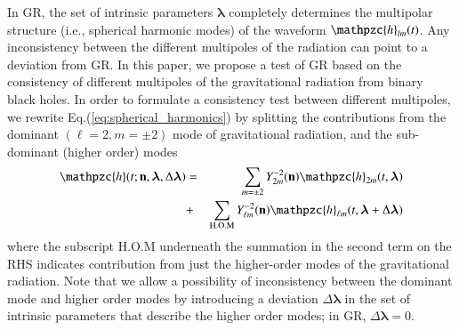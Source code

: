 \documentclass[prl,preprintnumbers,twocolumn,eqsecnum,floatfix,a4paper,nofootinbib,superscriptaddress]{revtex4}
\newcommand{\h}{\mathpzc{h}}
\newcommand{\hlm}{\mathpzc{h}_{\ell m}}
\newcommand{\Ylm}{{Y}^{-2}_{\ell m}}
\newcommand{\blambda}{\bm{\lambda}}
\newcommand{\n}{\mathbf{n}}
\begin{document}
In GR, the set of intrinsic parameters $\blambda$ completely determines the multipolar structure (i.e., spherical harmonic modes) of the waveform ${\h}_{lm}(t)$. Any inconsistency between the different multipoles of the radiation can point to a deviation from GR. In this paper, we propose a test of GR based on the consistency of different multipoles of the gravitational radiation from binary black holes. In order to formulate a consistency test between different multipoles, we rewrite Eq.(\ref{eq:spherical_harmonics}) by splitting the contributions from the dominant $(\ell = 2, m = \pm 2)$ mode of gravitational radiation, and the sub-dominant (higher order) modes 
\begin{eqnarray}
\h(t; \n, \blambda, \Delta \blambda) & = & \sum_{m = \pm2} Y^{-2}_{2m} (\n) {\h}_{2m}(t, \blambda)  \nonumber \\ 
& + & \sum _{\text{H.O.M}} \Ylm (\n) \hlm(t, \blambda+\Delta \blambda)
\label{eq:test_HM}
\end{eqnarray}
where the subscript H.O.M underneath the summation in the second term on the RHS indicates contribution from just the higher-order modes of the gravitational radiation. Note that we allow a possibility of inconsistency between the dominant mode and higher order modes by introducing a deviation $\Delta \blambda$ in the set of intrinsic parameters that describe the higher order modes; in GR,  $\Delta \blambda = 0$. 
\end{document}
